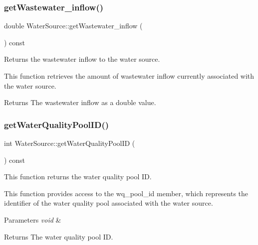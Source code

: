 \subsubsection{\texorpdfstring{get\+Wastewater\+\_\+inflow()}{getWastewater\_inflow()}}
{\footnotesize\ttfamily double Water\+Source\+::get\+Wastewater\+\_\+inflow (\begin{DoxyParamCaption}{ }\end{DoxyParamCaption}) const}



Returns the wastewater inflow to the water source. 

This function retrieves the amount of wastewater inflow currently associated with the water source.

\begin{DoxyReturn}{Returns}
The wastewater inflow as a double value. 
\end{DoxyReturn}
\mbox{\label{classWaterSource_a9d85cbca88eefd54fda383237807470d}} 
\subsubsection{\texorpdfstring{get\+Water\+Quality\+Pool\+I\+D()}{getWaterQualityPoolID()}}
{\footnotesize\ttfamily int Water\+Source\+::get\+Water\+Quality\+Pool\+ID (\begin{DoxyParamCaption}{ }\end{DoxyParamCaption}) const}



This function returns the water quality pool ID. 

This function provides access to the {\ttfamily wq\+\_\+pool\+\_\+id} member, which represents the identifier of the water quality pool associated with the water source.


\begin{DoxyParams}{Parameters}
{\em void} & \\
\hline
\end{DoxyParams}
\begin{DoxyReturn}{Returns}
The water quality pool ID. 
\end{DoxyReturn}
\mbox{\label{classWaterSource_a130fd661ff31c53115cca23e4e2f210a}} 

